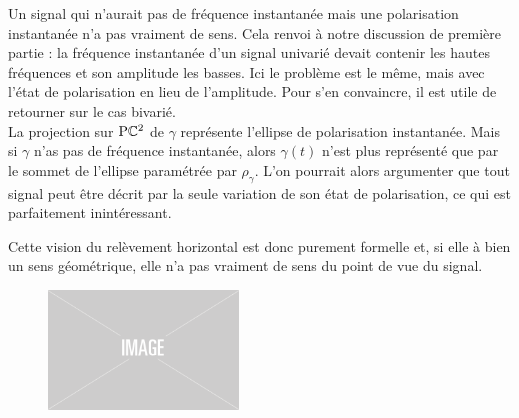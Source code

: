 \begin{remarque}
	Un signal qui n'aurait pas de fréquence instantanée mais une polarisation instantanée n'a pas vraiment de sens. 
	Cela renvoi à notre discussion de première partie : la fréquence instantanée d'un signal univarié devait contenir les hautes fréquences et son amplitude les basses.
	Ici le problème est le même, mais avec l'état de polarisation en lieu de l’amplitude. Pour s'en convaincre, il est utile de retourner sur le cas bivarié.
	\\
	La projection sur $\text{\normalfont P}\mathbb{C}^{2}$ de $\gamma$ représente l'ellipse de polarisation instantanée. 
	Mais si $\gamma$ n'as pas de fréquence instantanée, alors $\gamma(t)$ n'est plus représenté que par le sommet de l’ellipse paramétrée par $\rho_\gamma$. 
	L'on pourrait alors argumenter que tout signal peut être décrit par la seule variation de son état de polarisation, ce qui est parfaitement inintéressant.
	
	Cette vision du relèvement horizontal est donc purement formelle et, si elle à bien un sens géométrique, elle n'a pas vraiment de sens du point de vue du signal.
\end{remarque}
\skipl

\begin{figure}[h]
	\begin{floatrow}		
			{\includegraphics[width=0.45\textwidth]{fig/placeholder}}
			
	\end{floatrow}
\end{figure}

